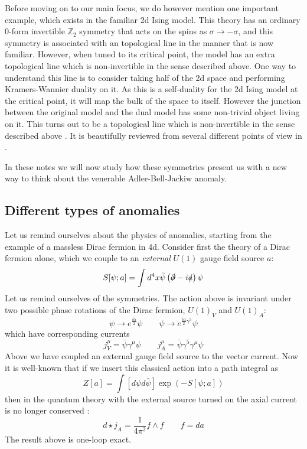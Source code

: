 \documentclass[aps,preprint,nofootinbib,preprintnumbers,eqsecnum,superscriptaddress]{revtex4}
\newcommand{\be}{\begin{equation}}
\newcommand{\ee}{\end{equation}}
\def\le{\left}
\def\ri{\right}
\def\al{{\alpha}}
\newcommand{\p}{\partial}
\newcommand\ga{{\ensuremath{{\gamma}}}}
\newcommand\sig{\sigma}
\newcommand\bpsi{{\bar \psi}}
\numberwithin{equation}{section}
\begin{document}
Before moving on to our main focus, we do however mention one important example, which exists in the familiar 2d Ising model. This theory has an ordinary 0-form invertible $\mathbb{Z}_2$ symmetry that acts on the spins as $\sig \to -\sig$, and this symmetry is associated with an topological line in the manner that is now familiar. However, when tuned to its critical point, the model has an extra topological line which is non-invertible in the sense described above. One way to understand this line is to consider taking half of the 2d space and performing Kramers-Wannier duality on it. As this is a self-duality for the 2d Ising model at the critical point, it will map the bulk of the space to itself. However the junction between the original model and the dual model has some non-trivial object living on it. This turns out to be a topological line which is non-invertible in the sense described above \cite{Frohlich:2004ef,Chang:2018iay}. It is beautifully reviewed from several different points of view in \cite{Shao:2023gho}. 

In these notes we will now study how these symmetries present us with a new way to think about the venerable Adler-Bell-Jackiw anomaly. 
\subsection{Different types of anomalies}
Let us remind ourselves about the physics of anomalies, starting from the example of a massless Dirac fermion in 4d. Consider first the theory of a Dirac fermion alone, which we couple to an {\it external} $U(1)$ gauge field source $a$:
\be
S[\psi;a] = \int d^4x \bpsi \le(\slashed{\p} - i \slashed{a}\ri) \psi
\ee
Let us remind ourselves of the symmetries. The action above is invariant under two possible phase rotations of the Dirac fermion, $U(1)_V$ and $U(1)_A$:
\be
\psi \to e^{\frac{i\al}{2}} \psi \qquad \psi \to e^{\frac{i \al}{2}\ga^5} \psi
\ee
which have corresponding currents
\be
j^{\mu}_V = \bpsi \ga^{\mu} \psi \qquad j^{\mu}_A = \bpsi \ga^5 \ga^{\mu}\psi
\ee
Above we have coupled an external gauge field source to the vector current. Now it is well-known that if we insert this classical action into a path integral as
\be
Z[a] = \int [d\psi d\bpsi] \exp(-S[\psi;a])
\ee
then in the quantum theory with the external source turned on the axial current is no longer conserved \cite{Adler:1969gk,Bell:1969ts}: 
\be
d \star j_{A} = \frac{1}{4\pi^2} f \wedge f \qquad f = da \label{thooft} 
\ee
The result above is one-loop exact. 
\end{document}
